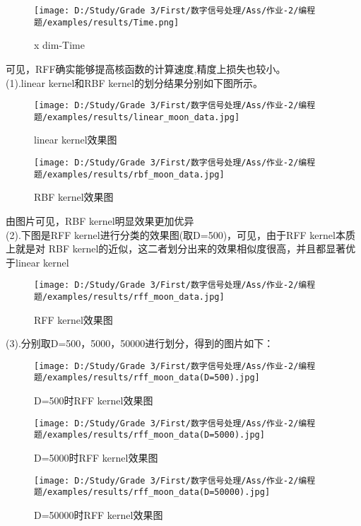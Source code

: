 \documentclass[answers]{exam}  %
\begin{document}
\begin{questions}
\newpage
\begin{figure}[h]
	\centering
	\texttt{[image: D:/Study/Grade 3/First/数字信号处理/Ass/作业-2/编程题/examples/results/Time.png]}
	\caption{x dim-Time}
\end{figure}
可见，RFF确实能够提高核函数的计算速度,精度上损失也较小。
\ \\
(1).linear kernel和RBF kernel的划分结果分别如下图所示。\\
\begin{figure}[h]
	\centering
	\texttt{[image: D:/Study/Grade 3/First/数字信号处理/Ass/作业-2/编程题/examples/results/linear\_moon\_data.jpg]}
	\caption{linear kernel效果图}
\end{figure}

\begin{figure}[!h]
	\centering
	\texttt{[image: D:/Study/Grade 3/First/数字信号处理/Ass/作业-2/编程题/examples/results/rbf\_moon\_data.jpg]}
	\caption{RBF kernel效果图}
\end{figure}
由图片可见，RBF kernel明显效果更加优异\\
\newpage
(2).下图是RFF kernel进行分类的效果图(取D=500)，可见，由于RFF kernel本质上就是对
RBF kernel的近似，这二者划分出来的效果相似度很高，并且都显著优于linear kernel\\
\begin{figure}[h]
	\centering
	\texttt{[image: D:/Study/Grade 3/First/数字信号处理/Ass/作业-2/编程题/examples/results/rff\_moon\_data.jpg]}
	\caption{RFF kernel效果图}
\end{figure}
(3).分别取D=500，5000，50000进行划分，得到的图片如下：\\
\begin{figure}[h]
	\centering
	\texttt{[image: D:/Study/Grade 3/First/数字信号处理/Ass/作业-2/编程题/examples/results/rff\_moon\_data(D=500).jpg]}
	\caption{D=500时RFF kernel效果图}
\end{figure}
\newpage
\begin{figure}[h]
	\centering
	\texttt{[image: D:/Study/Grade 3/First/数字信号处理/Ass/作业-2/编程题/examples/results/rff\_moon\_data(D=5000).jpg]}
	\caption{D=5000时RFF kernel效果图}
\end{figure}
\begin{figure}[!h]
	\centering
	\texttt{[image: D:/Study/Grade 3/First/数字信号处理/Ass/作业-2/编程题/examples/results/rff\_moon\_data(D=50000).jpg]}
	\caption{D=50000时RFF kernel效果图}

\end{figure}
\end{questions}
\end{document}
